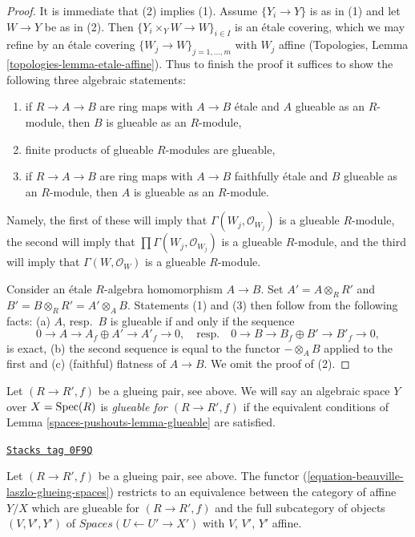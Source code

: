 \begin{proof}
It is immediate that (2) implies (1). Assume $\{Y_i \to Y\}$
is as in (1) and let $W \to Y$ be as in (2). Then
$\{Y_i \times_Y W \to W\}_{i \in I}$ is an \'etale covering,
which we may refine by an \'etale covering
$\{W_j \to W\}_{j = 1, \ldots, m}$ with $W_j$ affine
(Topologies, Lemma \ref{topologies-lemma-etale-affine}).
Thus to finish the proof it suffices to show
the following three algebraic statements:
\begin{enumerate}
\item if $R \to A \to B$ are ring maps with $A \to B$ \'etale
and $A$ glueable as an $R$-module, then $B$ is glueable as an
$R$-module,
\item finite products of glueable $R$-modules are glueable,
\item if $R \to A \to B$ are ring maps with $A \to B$ faithfully \'etale
and $B$ glueable as an $R$-module, then $A$ is glueable as an
$R$-module.
\end{enumerate}
Namely, the first of these will imply that $\Gamma(W_j, \mathcal{O}_{W_j})$
is a glueable $R$-module, the second will imply that
$\prod \Gamma(W_j, \mathcal{O}_{W_j})$ is a glueable $R$-module, and
the third will imply that $\Gamma(W, \mathcal{O}_W)$ is a glueable
$R$-module.

\medskip\noindent
Consider an \'etale $R$-algebra homomorphism $A \to B$. Set
$A' = A \otimes_R R'$ and $B' = B \otimes_R R' = A' \otimes_A B$.
Statements (1) and (3) then follow from the following facts:
(a) $A$, resp.\ $B$ is glueable if and only if the sequence
$$
0 \to A \to A_f \oplus A' \to A'_f \to 0,
\quad\text{resp.}\quad
0 \to B \to B_f \oplus B' \to B'_f \to 0,
$$
is exact, (b) the second sequence is equal to
the functor $- \otimes_A B$ applied to the first and
(c) (faithful) flatness of $A \to B$. We omit the proof of (2).
\end{proof}

Let $(R \to R', f)$ be a glueing pair, see above.
We will say an algebraic space $Y$ over $X = \operatorname{Spec}(R)$
is {\it glueable for $(R \to R', f)$}
if the equivalent conditions of Lemma \ref{spaces-pushouts-lemma-glueable}
are satisfied.

\begin{lemma}
\label{spaces-pushouts-lemma-glueing-affines}
\href{https://stacks.math.columbia.edu/tag/0F9Q}{\texttt{Stacks tag 0F9Q}}

Let $(R \to R', f)$ be a glueing pair, see above.
The functor (\ref{equation-beauville-laszlo-glueing-spaces})
restricts to an equivalence between the category of affine
$Y/X$ which are glueable for $(R \to R', f)$ and the
full subcategory of objects $(V, V', Y')$ of
$\textit{Spaces}(U \leftarrow U' \to X')$
with $V$, $V'$, $Y'$ affine.
\end{lemma}

